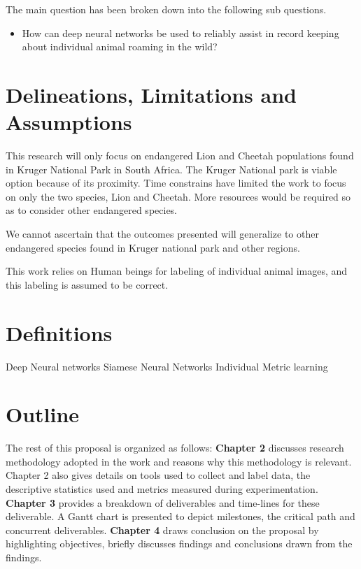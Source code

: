 The main question has been broken down into the following sub questions.
\begin{itemize}
    \item How can deep neural networks be used to reliably assist in record keeping about individual animal roaming in the wild?

\end{itemize}

\section{Delineations, Limitations and Assumptions}

This research will only focus on endangered Lion and Cheetah populations found in Kruger National Park in South Africa. The Kruger National park is viable option because of its proximity. Time constrains have limited the work to focus on only the two species, Lion and Cheetah. More resources would be required so as to consider other endangered species.

We cannot ascertain that the outcomes presented will generalize to other endangered species found in Kruger national park and other regions.

This work relies on Human beings for labeling of individual animal images, and this labeling is assumed to be correct.

\section{Definitions}
Deep Neural networks \newline
Siamese Neural Networks \newline
Individual \newline
Metric learning \newline

\section{Outline}
The rest of this proposal is organized as follows: \textbf{Chapter 2} discusses research methodology adopted in the work and reasons why this methodology is relevant. Chapter 2 also gives details on tools used to collect and label data, the descriptive statistics used and metrics measured during experimentation. \textbf{Chapter 3} provides a breakdown of deliverables and time-lines for these deliverable. A Gantt chart is presented to depict milestones, the critical path and concurrent deliverables. \textbf{Chapter 4} draws conclusion on the proposal by highlighting objectives, briefly discusses findings and conclusions drawn from the findings.  
